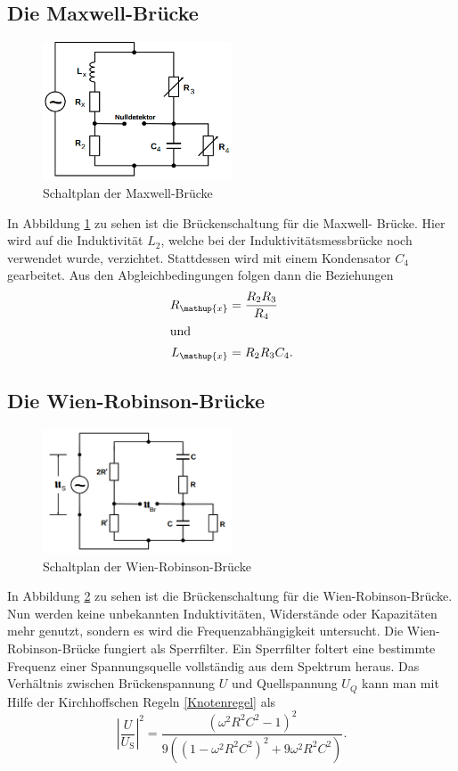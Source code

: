 \documentclass[
  bibliography=totoc,     %
  captions=tableheading,  %
  titlepage=firstiscover, %
]{scrartcl}
\begin{document}
\subsection{Die Maxwell-Brücke}
\begin{figure}[htb]
  \centering
  \includegraphics[width=0.5\textwidth]{V3025.png}
  \caption{Schaltplan der Maxwell-Brücke}
  \label{fig:V3025}
\end{figure}
In Abbildung \ref{fig:V3025} zu sehen ist die Brückenschaltung für die Maxwell-
Brücke. Hier wird auf die Induktivität $L_2$, welche bei der Induktivitätsmessbrücke
noch verwendet wurde, verzichtet. Stattdessen wird mit einem Kondensator $C_4$
gearbeitet. Aus den Abgleichbedingungen folgen dann die Beziehungen
\begin{align}
    \label{eq:maxwell_R}
    R_{\mathup{x}} &= \frac{R_2 R_3}{R_4} \\
    \shortintertext{und}
    \label{eq:maxwell_L}
    L_{\mathup{x}} &= R_2 R_3 C_4.
\end{align}

\newpage
\subsection{Die Wien-Robinson-Brücke}
\begin{figure}[htb]
  \centering
  \includegraphics[width=0.5\textwidth]{V3026.png}
  \caption{Schaltplan der Wien-Robinson-Brücke}
  \label{fig:V3026}
\end{figure}
In Abbildung \ref{fig:V3026} zu sehen ist die Brückenschaltung für die
Wien-Robinson-Brücke. Nun werden keine unbekannten Induktivitäten, Widerstände
oder Kapazitäten mehr genutzt, sondern es wird die Frequenzabhängigkeit
untersucht. Die Wien-Robinson-Brücke fungiert als Sperrfilter. Ein Sperrfilter
foltert eine bestimmte Frequenz einer Spannungsquelle vollständig aus dem
Spektrum heraus. Das Verhältnis zwischen Brückenspannung $U$ und Quellspannung
$U_Q$ kann man mit Hilfe der Kirchhoffschen Regeln \ref{Knotenregel} als
\begin{equation}
    \label{eq:wien_robinson_1}
    \left|\frac{U}{U_{\mathup{S}}}\right|^2 = \frac{\left(\omega^2 R^2 C^2 - 1\right)^2}{9\left(\left(1 - \omega^2 R^2 C^2\right)^2 + 9 \omega^2 R^2 C^2\right)}.
\end{equation}
\end{document}
